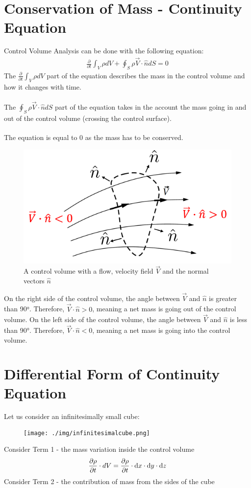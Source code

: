 \section{Conservation of Mass - Continuity Equation}
Control Volume Analysis can be done with the following equation:
\begin{gather}
  \frac{\partial}{\partial t} \int_{V}{\rho dV} + \oint_{S}{\rho \vec{V} \cdot \hat{n}dS} = 0
  \label{conservationofmass}
\end{gather}
The $\frac{\partial}{\partial t} \int_{V}{\rho dV}$ part of the equation describes the mass in the control volume and how it changes with time. \\\\
The $\oint_{S}{\rho \vec{V} \cdot \hat{n}dS}$ part of the equation takes in the account the mass going in and out of the control volume (crossing the control surface). \\\\
The equation is equal to 0 as the mass has to be conserved.
\begin{figure}[H]
  \centering
  \includegraphics[width = 0.7 \textwidth]{./img/Control Volume.PNG}
  \caption{A control volume with a flow, velocity field $\vec{V}$ and the normal vectors $\hat{n}$}
\end{figure}
On the right side of the control volume, the angle between $\vec{V}$ and $\hat{n}$ is greater than 90$\si{\degree}$. Therefore, $\vec{V} \cdot \hat{n} > 0$, meaning a net mass is going out of the control volume.
On the left side of the control volume, the angle between $\vec{V}$ and $\hat{n}$ is less than 90$\si{\degree}$. Therefore, $\vec{V} \cdot \hat{n} < 0$, meaning a net mass is going into the control volume.
\section{Differential Form of Continuity Equation}
Let us consider an infinitesimally small cube:
\begin{figure}[H]
  \centering
  \texttt{[image: ./img/infinitesimalcube.png]}
\end{figure}
Consider Term 1 - the mass variation inside the control volume
\begin{gather}
  \frac{\partial \rho}{\partial t} \cdot dV = \frac{\partial \rho}{\partial t} \cdot\dif x \cdot \dif y \cdot \dif z
  \label{massvariation}
\end{gather}
Consider Term 2 - the contribution of mass from the sides of the cube
